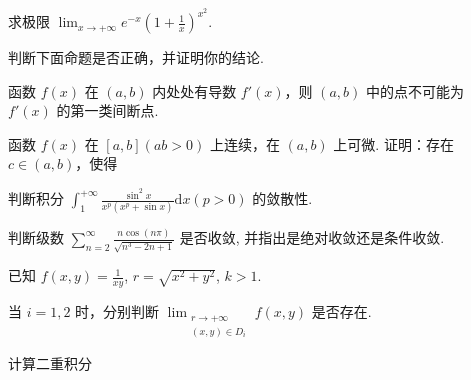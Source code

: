 求极限 $\lim_{x\to +\infty}e^{-x}\left(1 + \frac{1}{x}\right)^{x^2}$.\par
判断下面命题是否正确，并证明你的结论.\par
函数 $f(x)$ 在 $(a,b)$ 内处处有导数 $f'(x)$，则 $(a,b)$ 中的点不可能为 $f'(x)$ 的第一类间断点.\par
\par{}
函数 $f(x)$ 在 $[a, b] (ab > 0)$ 上连续，在 $(a, b)$ 上可微. 证明：存在 $c \in (a, b)$，使得\par
\nopagebreak[4]
判断积分 $\int_{1}^{+\infty}\frac{\sin^2x}{x^p(x^p + \sin x)}\mathrm{d}x (p > 0)$ 的敛散性.\par
判断级数 $\sum_{n=2}^{\infty} \frac{n \cos(n\pi)}{\sqrt{n^3 - 2n + 1}}$ 是否收敛, 并指出是绝对收敛还是条件收敛.\par
\par{}
已知 $f(x, y) = \frac{1}{xy}$, $r = \sqrt{x^2 + y^2}$, $k > 1$.\par
\nopagebreak[4]
当 $i = 1,2$ 时，分别判断 $\lim_{\substack{r\to +\infty \\ (x,y)\in D_i}}f(x,y)$ 是否存在.\par
\par{}
计算二重积分\par
\nopagebreak[4]
